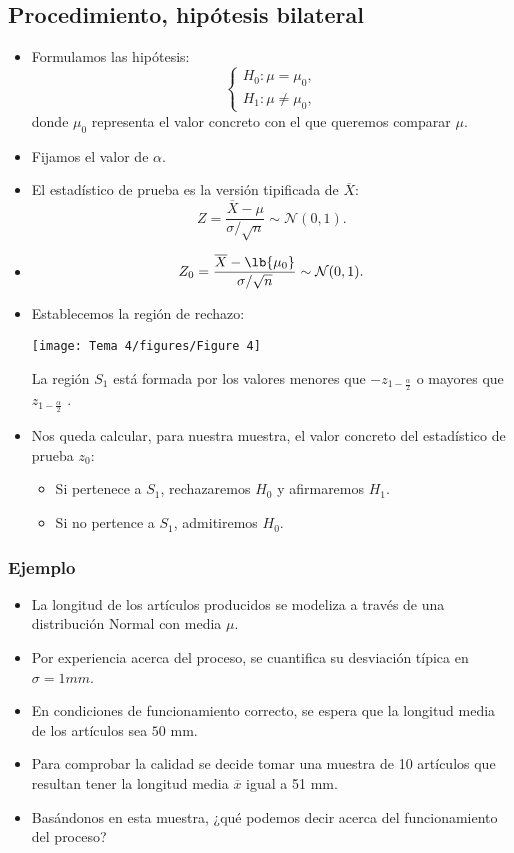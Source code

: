\subsection{Procedimiento, hipótesis bilateral}
\begin{itemize}[label=\textbullet]
    \item Formulamos las hipótesis: \[
    \begin{cases}
        H_0:\mu=\mu_0,\\
        H_1:\mu\neq \mu_0,
    \end{cases}
    \] donde $\mu_0$ representa el valor concreto con el que queremos comparar $\mu$.
\item Fijamos el valor de $\alpha$.
\item El estadístico de prueba es la versión tipificada de $\overline{X}$: \[
Z=\dfrac{\overline{X}-\mu}{\sigma / \sqrt{n} }\sim \mathcal{N}(0,1).
\] 
\item {} \[
Z_0=\dfrac{\overline{X}-\lb{\mu_0} }{\sigma / \sqrt{n} }\sim \mathcal{N}(0,1).
\]  
\item Establecemos la región de rechazo:
\begin{center}
    \texttt{[image: Tema 4/figures/Figure 4]}
\end{center}
La región $S_1$ está formada por los valores menores que $-z_{1-\frac{\alpha}{2} }$ o mayores que $z_{1-\frac{\alpha}{2} }$ .
\item Nos queda calcular, para nuestra muestra, el valor concreto del estadístico de prueba $z_0$:
    \begin{itemize}[label=\textrightarrow]
        \item Si pertenece a $S_1$, rechazaremos $H_0$ y afirmaremos $H_1$.
        \item Si no pertence a $S_1$, admitiremos $H_0$.
    \end{itemize}
\end{itemize}
\subsubsection*{Ejemplo}
\begin{tcolorbox}[colback=blue!5!white, colframe=blue!75!black, title=\textbf{En un proceso de producción}]
\begin{itemize}[label=\textbullet]
    \item La longitud de los artículos producidos se modeliza a través de una distribución Normal con media $\mu$.
    \item Por experiencia acerca del proceso, se cuantifica su desviación típica en $\sigma=1mm$.
    \item En condiciones de funcionamiento correcto, se espera que la longitud media de los artículos sea  $50$ mm.
    \item Para comprobar la calidad se decide tomar una muestra de 10 artículos que resultan tener la longitud media  $\overline{x}$ igual a 51 mm.
    \item Basándonos en esta muestra, ¿qué podemos decir acerca del funcionamiento del proceso?
\end{itemize}
\end{tcolorbox}
